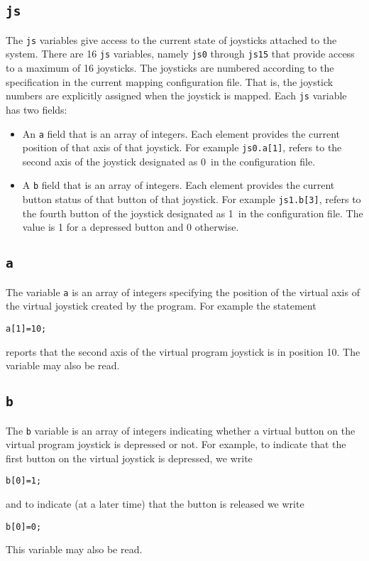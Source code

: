 \documentclass{article}
\begin{document}
\subsection{{\tt js}}
The {\tt js} variables give access to the current state of
joysticks attached to the system. There are 16 {\tt js}
variables, namely {\tt js0} through {\tt js15} that
provide access to a maximum of 16 joysticks. The joysticks
are numbered according to the specification in the
current mapping configuration file. That is, the joystick
numbers are explicitly assigned when the joystick is
mapped. Each {\tt js} variable has two fields:
\begin{itemize}
	\item An {\tt a} field that is an array of integers.
		Each element provides the current position
		of that axis of that joystick.
		For example {\tt js0.a[1]}, refers to
		the second axis of the joystick designated
		as 0~in the configuration file.
	\item A {\tt b} field that is an array of integers.
		Each element provides the current button status 
		of that button of that joystick.
		For example {\tt js1.b[3]}, refers to
		the fourth button of the joystick designated
		as 1~in the configuration file. The value is
		1 for a depressed button and 0 otherwise.
\end{itemize}

\subsection{{\tt a}}
The variable {\tt a} is an array of integers specifying the
position of the virtual axis of the virtual joystick 
created by the program. For example the
statement
\begin{center}
	{\tt a[1]=10;}
\end{center}
reports that the second axis of the virtual program joystick
is in position 10. The variable may also be read.

\subsection{{\tt b}}
The {\tt b} variable is an array of integers indicating
whether a virtual button on the virtual program joystick 
is depressed or not. For example, to indicate that
the first button on the virtual joystick is
depressed, we write
\begin{center}
	{\tt b[0]=1;}
\end{center}
and to indicate (at a later time) that the button is released
we write
\begin{center}
	{\tt b[0]=0;}
\end{center}
This variable may also be read.
\end{document}
